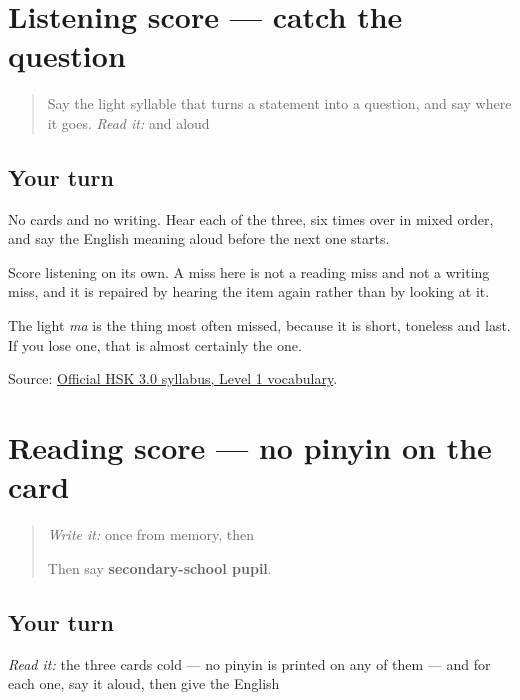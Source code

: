 \section[Practice]{Listening score — catch the question}

\label{lesson:ZH-R19-listening-three}



\begin{quote}
Say the light syllable that turns a statement into a question, and say where it goes. \emph{Read it:} \textbf{} and \textbf{} aloud
\end{quote}

\subsection*{Your turn}
No cards and no writing. Hear each of the three, six times over in mixed order, and say the English meaning aloud before the next one starts.

Score listening on its own. A miss here is not a reading miss and not a writing miss, and it is repaired by hearing the item again rather than by looking at it.

The light \emph{ma} is the thing most often missed, because it is short, toneless and last. If you lose one, that is almost certainly the one.

\begin{tcolorbox}[breakable,colback=teal!4,colframe=teal!35!black,title={Before you move on}]
Source: \href{https://hsk.cn-bj.ufileos.com/3.0/\%E6\%96\%B0\%E7\%89\%88HSK\%E8\%80\%83\%E8\%AF\%95\%E5\%A4\%A7\%E7\%BA\%B21219.pdf}{Official HSK 3.0 syllabus, Level 1 vocabulary}.
\end{tcolorbox}
\section[Practice]{Reading score — no pinyin on the card}

\label{lesson:ZH-R19-reading-three}



\begin{quote}
\emph{Write it:}  once from memory, then 

Then say \textbf{secondary-school pupil}.
\end{quote}

\subsection*{Your turn}
\emph{Read it:} the three cards cold — no pinyin is printed on any of them — and for each one, say it aloud, then give the English


